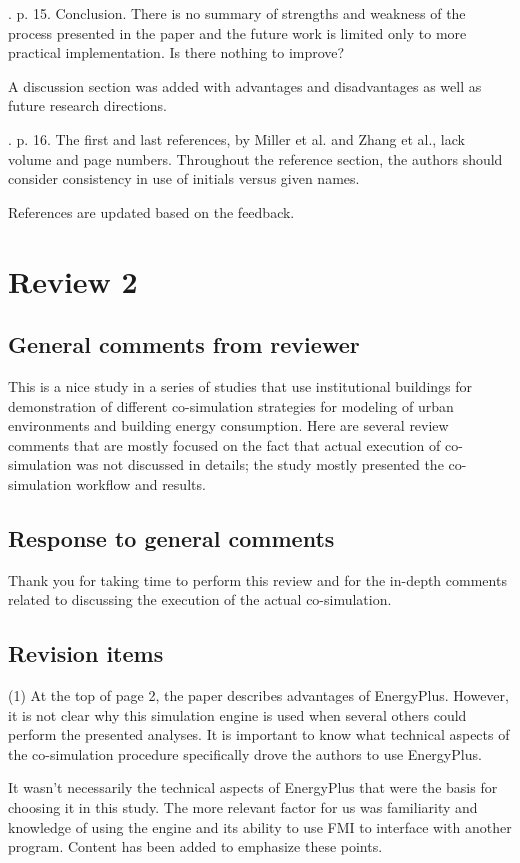 \documentclass[answers,12pt]{exam}
\begin{document}
\begin{questions}
. p. 15.  Conclusion.  There is no summary of strengths and weakness of the process presented in the paper and the future work is limited only to more practical implementation.  Is there nothing to improve? 
\begin{solution}
A discussion section was added with advantages and disadvantages as well as future research directions.
\end{solution}

. p. 16. The first and last references, by Miller et al. and Zhang et al., lack volume and page numbers.  Throughout the reference section, the authors should consider consistency in use of initials versus given names.   
\begin{solution}
References are updated based on the feedback.
\end{solution}

\pagebreak
\section{Review 2}

\subsection{General comments from reviewer}
This is a nice study in a series of studies that use institutional buildings for demonstration of different co-simulation strategies for modeling of urban environments and building energy consumption. Here are several review comments that are mostly focused on the fact that actual execution of co-simulation was not discussed in details; the study mostly presented the co-simulation workflow and results. 


\subsection{Response to general comments}
\begin{solution}
Thank you for taking time to perform this review and for the in-depth comments related to discussing the execution of the actual co-simulation.
\end{solution}

\subsection{Revision items}

\question 
(1) At the top of page 2, the paper describes advantages of EnergyPlus. However, it is not clear why this simulation engine is used when several others could perform the presented analyses. It is important to know what technical aspects of the co-simulation procedure specifically drove the authors to use EnergyPlus. 
\begin{solution}
It wasn't necessarily the technical aspects of EnergyPlus that were the basis for choosing it in this study. The more relevant factor for us was familiarity and knowledge of using the engine and its ability to use FMI to interface with another program. Content has been added to emphasize these points.
\end{solution}


\end{questions}
\end{document}
